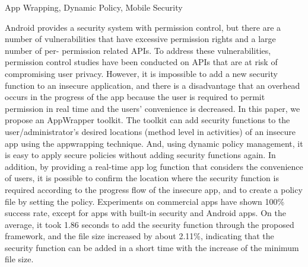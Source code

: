 \begin{abstract}
	{Appwrapping，动态策略，移动安全}
	
	Android提供了一个具有权限控制的安全系统，但是有许多漏洞具有过多的权限和大量与权限相关的API。为了解决这些漏洞，已经对可能危及用户隐私风险的API进行了权限控制研究。然而，不可能向不安全的应用程序添加新的安全功能，并且存在在应用程序的进程中发生开销的缺点，因为要求用户实时许可并且减少用户的便利性。在本文中，我们提出了一个AppWrapper工具包。该工具包可以使用appwrapping技术向用户/管理员的不安全应用程序的所需位置（活动中的方法级别）添加安全功能。而且，使用动态策略管理，可以轻松应用安全策略，而无需再次添加安全功能。此外，通过提供考虑用户便利性的实时应用程序日志功能，可以根据不安全应用程序的进度流程确认需要安全功能的位置，并通过设置创建策略文件政策。除了内置安全性和Android应用程序的应用程序外，商业应用程序的实验已经显示出100％的成功率。平均而言，通过建议的框架添加安全功能花了1.86秒，文件大小增加了大约2.11％，表明随着最小文件大小的增加可以在短时间内添加安全功能。
	
\end{abstract}

\begin{englishabstract}
	{App Wrapping, Dynamic Policy, Mobile Security }
	
	Android provides a security system with permission control, but there are a number of vulnerabilities that have excessive permission rights and a large number of per- permission related APIs. To address these vulnerabilities, permission control studies have been conducted on APIs that are at risk of compromising user privacy. However, it is impossible to add a new security function to an insecure application, and there is a disadvantage that an overhead occurs in the progress of the app because the user is required to permit permission in real time and the users’ convenience is decreased. In this paper, we propose an AppWrapper toolkit. The toolkit can add security functions to the user/administrator’s desired locations (method level in activities) of an insecure app using the appwrapping technique. And, using dynamic policy management, it is easy to apply secure policies without adding security functions again. In addition, by providing a real-time app log function that considers the convenience of users, it is possible to confirm the location where the security function is required according to the progress flow of the insecure app, and to create a policy file by setting the policy. Experiments on commercial apps have shown 100\% success rate, except for apps with built-in security and Android apps. On the average, it took 1.86 seconds to add the security function through the proposed framework, and the file size increased by about 2.11\%, indicating that the security function can be added in a short time with the increase of the minimum file size.	
\end{englishabstract}
